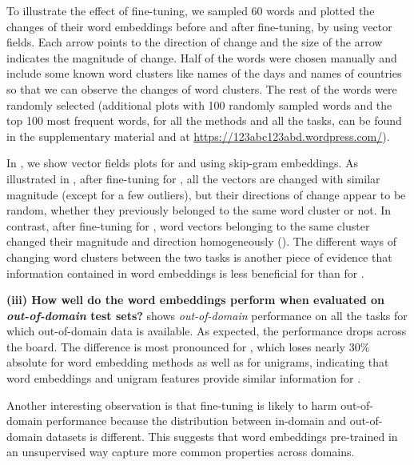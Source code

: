 To illustrate the effect of fine-tuning, we sampled 60 words and plotted the changes of their word embeddings before and after fine-tuning, by using vector fields. Each arrow points to the direction of change and the size of the arrow indicates the magnitude of change.  Half of the words were chosen manually and include some known word clusters like names of the days and names of countries so that we can observe the changes of word clusters.  The rest of the words were randomly selected (additional plots with 100 randomly sampled words and the top 100 most frequent words, for all the methods and all the tasks, can be found in the supplementary material and at \url{https://123abc123abd.wordpress.com/}).

In , we show vector fields plots for \chunking and \ner using skip-gram embeddings.
As illustrated in , after fine-tuning for \chunking, all the vectors are changed with similar magnitude 
(except for a few outliers), but their directions of change appear to be random, 
whether they previously belonged to the same word cluster or not. 
In contrast, after fine-tuning for \ner, word vectors belonging to the same cluster changed their magnitude and direction homogeneously (). 
The different ways of changing word clusters between the two tasks is another piece of evidence that information contained in word embeddings is less beneficial for \chunking than for \ner. 


\textbf{(iii) How well do the word embeddings perform when evaluated on \textit{out-of-domain} test sets?}
 shows \textit{out-of-domain} performance on all the tasks for which out-of-domain data is available.
As expected, the performance drops across the board. The difference is most pronounced for \chunking, which loses nearly 30\% absolute for word embedding methods as well as for unigrams, 
indicating that word embeddings and unigram features provide similar information 
for \chunking. 


Another interesting observation is that fine-tuning is likely to harm out-of-domain performance because the distribution between in-domain and out-of-domain datasets is different. This suggests that word embeddings pre-trained in an unsupervised way capture more common properties across domains. 

